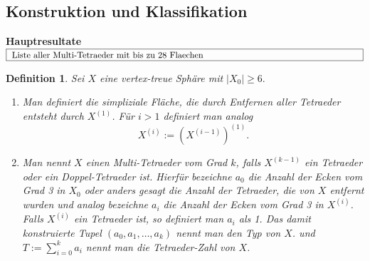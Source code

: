 \documentclass[12pt,titlepage,twoside,cleardoublepage]{article}
\theoremstyle{nummermitklammern}
\newtheorem{definition}[temp]{Definition}
\newtheorem{definition}[zahl]{Definition}
\numberwithin{equation}{section}
\begin{document}
\subsection{Konstruktion und Klassifikation}
\textbf{Hauptresultate}\\
$\fbox{
\parbox{14cm}{Liste aller Multi-Tetraeder mit bis zu 28 Flaechen}}$
\begin{definition}
Sei $X$ eine vertex-treue Sphäre mit $\vert X_0\vert \geq 6.$
\begin{enumerate}
\item Man definiert die simpliziale Fläche, die durch Entfernen aller Tetraeder entsteht durch $X^{(1)}$. Für $i>1$ definiert man analog 
\[
X^{(i)}:=(X^{(i-1)})^{(1)}.
\]
\item Man nennt $X$ einen Multi-Tetraeder vom \emph{Grad} $k$, falls $X^{(k-1)}$ ein Tetraeder oder ein Doppel-Tetraeder ist. Hierfür bezeichne $a_0$ die Anzahl der Ecken vom Grad 3 in $X_0$ oder anders gesagt die Anzahl der Tetraeder, die von $X$ entfernt wurden und analog bezeichne $a_i$ die Anzahl der Ecken vom Grad 3 in $X^{(i)}$. Falls $X^{(i)}$ ein Tetraeder ist, so definiert man $a_i$ als 1. Das damit konstruierte Tupel $(a_0,a_1,\ldots,a_k)$ nennt man den \emph{Typ} von $X$. und $T:=\sum_{i=0}^{k} a_i$ nennt man die \emph{Tetraeder-Zahl} von $X$.\\
\end{enumerate}
\end{definition}
\end{document}
